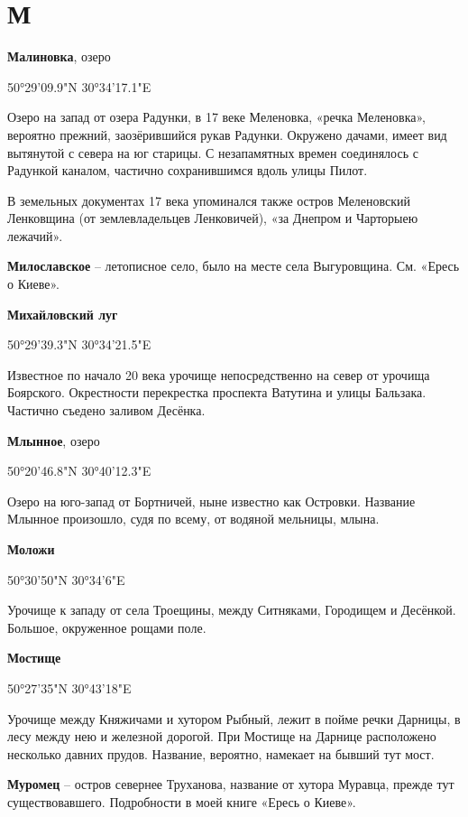 \chapter*{М}

\textbf{Малиновка}, озеро 

50°29'09.9"N 30°34'17.1"E

Озеро на запад от озера Радунки, в 17 веке  Меленовка, «речка Меленовка», вероятно прежний, заозёрившийся рукав Радунки. Окружено дачами, имеет вид вытянутой с севера на юг старицы. С незапамятных времен соединялось с Радункой каналом, частично сохранившимся вдоль улицы Пилот.

В земельных документах 17 века упоминался также остров Меленовский Ленковщина (от землевладельцев Ленковичей), «за Днепром и Чарторыею лежачий».\\

\medskip

\textbf{Милославское} – летописное село, было на месте села Выгуровщина. См. «Ересь о Киеве».\\

\medskip

\textbf{Михайловский луг} 

50°29'39.3"N 30°34'21.5"E

Известное по начало 20 века урочище непосредственно на север от урочища Боярского. Окрестности перекрестка проспекта Ватутина и улицы Бальзака. Частично съедено заливом Десёнка.\\

\medskip

\textbf{Млынное}, озеро

50°20'46.8"N 30°40'12.3"E

Озеро на юго-запад от Бортничей, ныне известно как Островки. Название Млынное произошло, судя по всему, от водяной мельницы, млына.\\

\medskip

\textbf{Моложи} 

50°30'50"N 30°34'6"E

Урочище к западу от села Троещины, между Ситняками, Городищем и Десёнкой. Большое, окруженное рощами поле.\\

\medskip

\textbf{Мостище}

50°27'35"N 30°43'18"E

Урочище между Княжичами и хутором Рыбный, лежит в пойме речки Дарницы, в лесу между нею и железной дорогой. При Мостище на Дарнице расположено несколько давних прудов. Название, вероятно, намекает на бывший тут мост.\\

\medskip

\textbf{Муромец} – остров севернее Труханова, название от хутора Муравца, прежде тут существовавшего. Подробности в моей книге «Ересь о Киеве».
